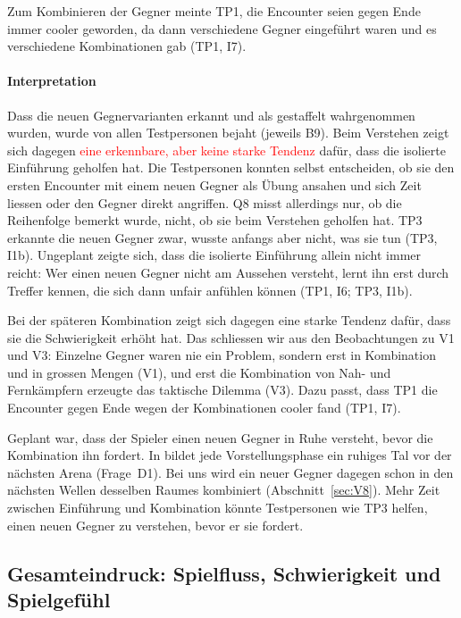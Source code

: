 \documentclass[../Main.tex]{subfiles}
\begin{document}
Zum Kombinieren der Gegner meinte TP1, die Encounter seien gegen Ende immer cooler geworden, da dann verschiedene Gegner eingeführt waren und es verschiedene Kombinationen gab (TP1, I7).

\paragraph{Interpretation}
Dass die neuen Gegnervarianten erkannt und als gestaffelt wahrgenommen wurden, wurde von allen Testpersonen bejaht (jeweils B9). Beim Verstehen zeigt sich dagegen \textcolor{red}{eine erkennbare, aber keine starke Tendenz} dafür, dass die isolierte Einführung geholfen hat. Die Testpersonen konnten selbst entscheiden, ob sie den ersten Encounter mit einem neuen Gegner als Übung ansahen und sich Zeit liessen oder den Gegner direkt angriffen. Q8 misst allerdings nur, ob die Reihenfolge bemerkt wurde, nicht, ob sie beim Verstehen geholfen hat. TP3 erkannte die neuen Gegner zwar, wusste anfangs aber nicht, was sie tun (TP3, I1b). Ungeplant zeigte sich, dass die isolierte Einführung allein nicht immer reicht: Wer einen neuen Gegner nicht am Aussehen versteht, lernt ihn erst durch Treffer kennen, die sich dann unfair anfühlen können (TP1, I6; TP3, I1b).

Bei der späteren Kombination zeigt sich dagegen eine starke Tendenz dafür, dass sie die Schwierigkeit erhöht hat. Das schliessen wir aus den Beobachtungen zu V1 und V3: Einzelne Gegner waren nie ein Problem, sondern erst in Kombination und in grossen Mengen (V1), und erst die Kombination von Nah- und Fernkämpfern erzeugte das taktische Dilemma (V3). Dazu passt, dass TP1 die Encounter gegen Ende wegen der Kombinationen cooler fand (TP1, I7).

Geplant war, dass der Spieler einen neuen Gegner in Ruhe versteht, bevor die Kombination ihn fordert. In  bildet jede Vorstellungsphase ein ruhiges Tal vor der nächsten Arena (Frage~D1). Bei uns wird ein neuer Gegner dagegen schon in den nächsten Wellen desselben Raumes kombiniert (Abschnitt~\ref{sec:V8}). Mehr Zeit zwischen Einführung und Kombination könnte Testpersonen wie TP3 helfen, einen neuen Gegner zu verstehen, bevor er sie fordert.

\subsection{Gesamteindruck: Spielfluss, Schwierigkeit und Spielgefühl} \label{sec:Gesamteindruck} \label{sec:ErgAllgemein}
\end{document}
